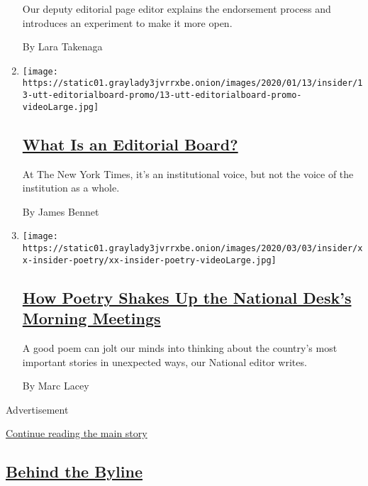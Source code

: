 \begin{enumerate}
  Our deputy editorial page editor explains the endorsement process and
  introduces an experiment to make it more open.

  By Lara Takenaga
\item
  \texttt{[image: https://static01.graylady3jvrrxbe.onion/images/2020/01/13/insider/13-utt-editorialboard-promo/13-utt-editorialboard-promo-videoLarge.jpg]}

  \hypertarget{what-is-an-editorial-board}{%
  \subsection{\texorpdfstring{\href{/2020/01/13/reader-center/editorial-board-explainer.html}{What
  Is an Editorial
  Board?}}{What Is an Editorial Board?}}\label{what-is-an-editorial-board}}

  At The New York Times, it's an institutional voice, but not the voice
  of the institution as a whole.

  By James Bennet
\item
  \texttt{[image: https://static01.graylady3jvrrxbe.onion/images/2020/03/03/insider/xx-insider-poetry/xx-insider-poetry-videoLarge.jpg]}

  \hypertarget{how-poetry-shakes-up-the-national-desks-morning-meetings}{%
  \subsection{\texorpdfstring{\href{/2020/03/05/reader-center/poetry-national-news.html}{How
  Poetry Shakes Up the National Desk's Morning
  Meetings}}{How Poetry Shakes Up the National Desk's Morning Meetings}}\label{how-poetry-shakes-up-the-national-desks-morning-meetings}}

  A good poem can jolt our minds into thinking about the country's most
  important stories in unexpected ways, our National editor writes.

  By Marc Lacey
\end{enumerate}

Advertisement

\protect\hyperlink{after-mid3}{Continue reading the main story}

\hypertarget{behind-the-byline}{%
\subsection{\texorpdfstring{\href{/column/behind-the-byline}{Behind the
Byline}}{Behind the Byline}}\label{behind-the-byline}}

